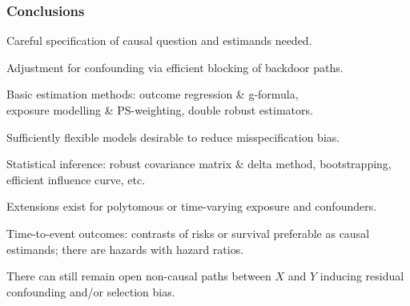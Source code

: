 \documentclass[12pt,dvipsnames,t,aspectratio=169, handout%
]{beamer}
\begin{document}
\begin{frame}
\frametitle{\large Conclusions}

\bi
\item 
Careful specification of causal question and estimands needed.
\pause
\medskip
\item 
Adjustment for confounding via efficient blocking of backdoor paths.
\pause
\medskip
\item
Basic estimation methods: outcome regression \& g-formula, \\ 
exposure modelling \& PS-weighting, double robust estimators.
\pause 
\medskip
\item
Sufficiently flexible models desirable to reduce misspecification bias.
\pause
\medskip
\item 
Statistical inference: robust covariance matrix \& delta method, bootstrapping,
efficient influence curve, etc.  
\pause
\medskip
\item
Extensions exist for
 polytomous or time-varying exposure and confounders.
 \pause
 \medskip
\item
Time-to-event outcomes: contrasts of risks or survival preferable as causal estimands; 
there are hazards with hazard ratios.  
\pause
\medskip
 \item
There can still remain open non-causal paths between $X$ and $Y$ 
inducing residual confounding and/or selection bias.
\ei

\end{frame}
\end{document}
